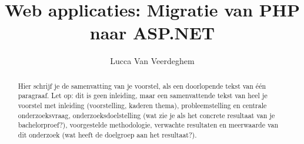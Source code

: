 \documentclass{hogent-article}
\title{Web applicaties: Migratie van PHP naar ASP.NET }
\author{Lucca Van Veerdeghem}
\begin{document}
\begin{abstract}
  Hier schrijf je de samenvatting van je voorstel, als een doorlopende tekst van één paragraaf. Let op: dit is geen inleiding, maar een samenvattende tekst van heel je voorstel met inleiding (voorstelling, kaderen thema), probleemstelling en centrale onderzoeksvraag, onderzoeksdoelstelling (wat zie je als het concrete resultaat van je bachelorproef?), voorgestelde methodologie, verwachte resultaten en meerwaarde van dit onderzoek (wat heeft de doelgroep aan het resultaat?).
\end{abstract}

\tableofcontents



\printbibliography[heading=bibintoc]
\end{document}
